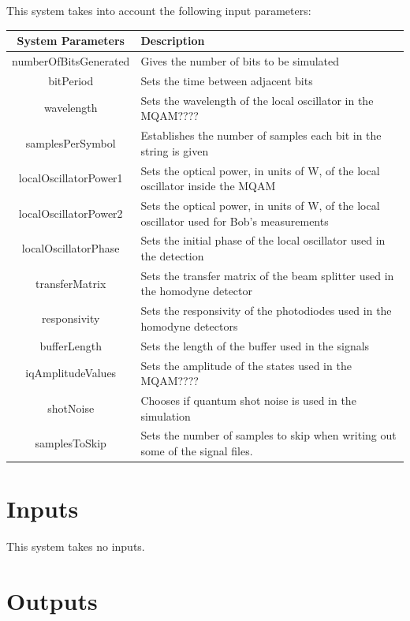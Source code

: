 \documentclass[a4paper]{article}
\begin{document}
This system takes into account the following input parameters:
\begin{table}[H]
\centering
\begin{tabulary}{1.0\textwidth}{|C|L|}
\hline
\textbf{System Parameters} & \textbf{Description}\\
\hline
numberOfBitsGenerated   & Gives the number of bits to be simulated\\
\hline  
bitPeriod               & Sets the time between adjacent bits\\
\hline 
wavelength              & Sets the wavelength of the local oscillator in the MQAM????\\
\hline 
samplesPerSymbol        & Establishes the number of samples each bit in the string is given\\ 
\hline
localOscillatorPower1   & Sets the optical power, in units of W, of the local oscillator inside the MQAM\\
\hline  
localOscillatorPower2   & Sets the optical power, in units of W, of the local oscillator used for Bob's measurements\\
\hline  
localOscillatorPhase    & Sets the initial phase of the local oscillator used in the detection\\
\hline  
transferMatrix          & Sets the transfer matrix of the beam splitter used in the homodyne detector\\ 
\hline  
responsivity            & Sets the responsivity of the photodiodes used in the homodyne detectors\\ 
\hline  
bufferLength            & Sets the length of the buffer used in the signals\\
\hline  
iqAmplitudeValues       & Sets the amplitude of the states used in the MQAM????\\
\hline
shotNoise               & Chooses if quantum shot noise is used in the simulation\\
\hline
samplesToSkip			& Sets the number of samples to skip when writing out some of the signal files.\\
\hline
\end{tabulary}
\end{table}		

\section{Inputs}

This system takes no inputs.

\pagebreak
\section{Outputs}
\end{document}
